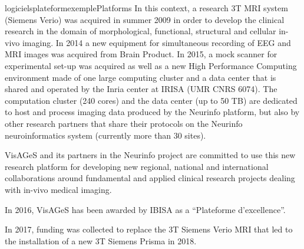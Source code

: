 \documentclass{ra2018}
\begin{document}
\begin{module}{logiciels}{plateformexemple}{Platforms}
In this context, a research 3T MRI system (Siemens Verio) was acquired in summer 2009 in order to develop the clinical research in the domain of morphological, functional, structural and cellular in-vivo imaging. In 2014 a new equipment for simultaneous recording of EEG and MRI images was acquired from Brain Product. In 2015, a mock scanner for experimental set-up was acquired as well as a new High Performance Computing environment made of one large computing cluster and a data center that is shared and operated by the Inria center at IRISA (UMR CNRS 6074). The computation cluster (240 cores) and the data center (up to 50 TB) are dedicated to host and process imaging data produced by the Neurinfo platform, but also by other research partners that share their protocols on the Neurinfo neuroinformatics system (currently more than 30 sites).

VisAGeS and its partners in the Neurinfo project are committed to use this new research platform for developing new regional, national and international collaborations around fundamental and applied clinical research projects dealing with in-vivo medical imaging.

In 2016, VisAGeS has been awarded by IBISA as a “Plateforme d'excellence”.

In 2017, funding was collected to replace the 3T Siemens Verio MRI that led to the installation of a new 3T Siemens Prisma in 2018.

 \end{module}



\end{document}
